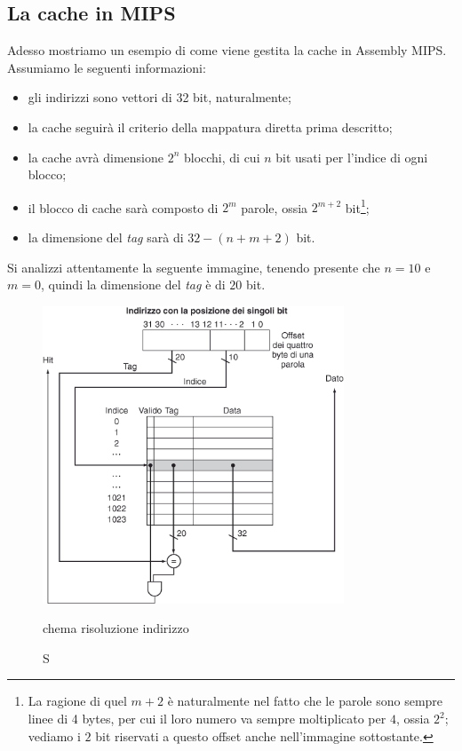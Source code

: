 \documentclass[class=book, crop=false, oneside]{standalone}
\begin{document}
\subsection{La cache in MIPS}
Adesso mostriamo un esempio di come viene gestita la cache in Assembly MIPS. Assumiamo le seguenti informazioni:
\begin{itemize}
  \item gli indirizzi sono vettori di 32 bit, naturalmente;
  \item la cache seguirà il criterio della mappatura diretta prima descritto;
  \item la cache avrà dimensione \(2^{n}\) blocchi, di cui \(n\) bit usati per l'indice di ogni blocco;
  \item il blocco di cache sarà composto di \(2^{m}\) parole, ossia \(2^{m+2}\) bit\footnote{La ragione di quel \(m + 2\) è naturalmente nel fatto che le parole sono sempre linee di 4 bytes, per cui il loro numero va sempre moltiplicato per \(4\), ossia \(2^{2}\); vediamo i \(2\) bit riservati a questo offset anche nell'immagine sottostante.};
  \item la dimensione del \emph{tag} sarà di \(32-(n+m+2)\) bit.
\end{itemize}
Si analizzi attentamente la seguente immagine, tenendo presente che \(n=10\) e \(m=0\), quindi la dimensione del \emph{tag} è di \(20\) bit.
\begin{figure}[H]
  \centering
  \includegraphics[width=0.8\textwidth,keepaspectratio]{mipscache.png}
  \caption Schema risoluzione indirizzo
\end{figure}
\end{document}
